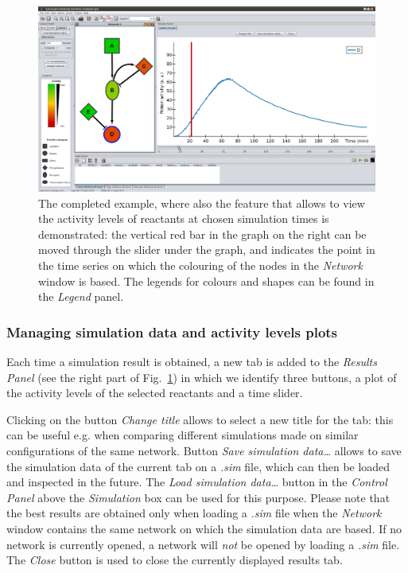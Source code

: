 \begin{figure}[!tpb]
\begin{minipage}{\textwidth}
\begin{center}
  \includegraphics[width=.9\textheight, angle=90]{images/esempio_uso_ANIMO3}
\end{center}
\caption{The completed example, where also the feature that allows to view the activity levels
of reactants at chosen simulation times is demonstrated: the vertical red bar in the graph on the
right can be moved through the slider under the graph, and indicates the point in the time series
on which the colouring of the nodes in the \emph{Network} window is based.
The legends for colours and shapes can be found in the \emph{Legend} panel.}\label{fig:rete-esempio}
\end{minipage}
\end{figure}


\subsubsection{Managing simulation data and activity levels plots}
Each time a simulation result is obtained, a new tab is added to the \emph{Results Panel} (see the right part of Fig.~\ref{fig:rete-esempio})
in which we identify three buttons, a plot of the activity levels of the selected reactants and a time slider.

Clicking on the button \emph{Change title} allows to select a new title for the tab: this can be useful e.g. when comparing different
simulations made on similar configurations of the same network. Button \emph{Save simulation data\dots} allows to save
the simulation data of the current tab on a \emph{.sim} file, which can then be loaded and inspected in the future.
The \emph{Load simulation data\dots} button in the \emph{Control Panel} above the \emph{Simulation} box can be used for this purpose.
Please note that the best results are obtained only when loading a \emph{.sim} file when the \emph{Network} window contains the same network
on which the simulation data are based. If no network is currently opened, a network will \emph{not} be opened by loading a \emph{.sim} file.
The \emph{Close} button is used to close the currently displayed results tab.

